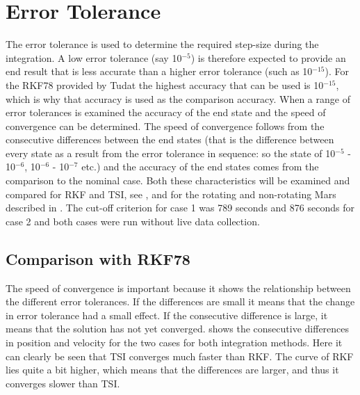 \section{Error Tolerance}
\label{sec:errorTolerance}
The error tolerance is used to determine the required step-size during the integration. A low error tolerance (say 10$^{-5}$) is therefore expected to provide an end result that is less accurate than a higher error tolerance (such as 10$^{-15}$). For the \ac{RKF78} provided by \ac{Tudat} the highest accuracy that can be used is 10$^{-15}$, which is why that accuracy is used as the comparison accuracy. When a range of error tolerances is examined the accuracy of the end state and the speed of convergence can be determined. The speed of convergence follows from the consecutive differences between the end states (that is the difference between every state as a result from the error tolerance in sequence: so the state of 10$^{-5}$ - 10$^{-6}$, 10$^{-6}$ - 10$^{-7}$ etc.) and the accuracy of the end states comes from the comparison to the nominal case. Both these characteristics will be examined and compared for \ac{RKF} and \ac{TSI}, see , and for the rotating and non-rotating Mars described in . The cut-off criterion for case 1 was 789 seconds and 876 seconds for case 2 and both cases were run without live data collection.




\subsection{Comparison with \ac{RKF78}}
\label{subsec:errorToleranceCompRKF}
The speed of convergence is important because it shows the relationship between the different error tolerances. If the differences are small it means that the change in error tolerance had a small effect. If the consecutive difference is large, it means that the solution has not yet converged.  shows the consecutive differences in position and velocity for the two cases for both integration methods. Here it can clearly be seen that \ac{TSI} converges much faster than \ac{RKF}. The curve of \ac{RKF} lies quite a bit higher, which means that the differences are larger, and thus it converges slower than \ac{TSI}.




